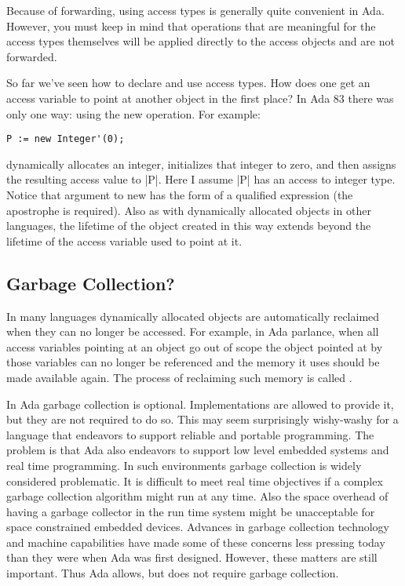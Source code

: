 Because of forwarding, using access types is generally quite convenient in Ada. However, you
must keep in mind that operations that are meaningful for the access types themselves will be
applied directly to the access objects and are not forwarded.

So far we've seen how to declare and use access types. How does one get an access variable to
point at another object in the first place? In Ada 83 there was only one way: using the new
operation. For example:

\begin{lstlisting}
P := new Integer'(0);
\end{lstlisting}

dynamically allocates an integer, initializes that integer to zero, and then assigns the
resulting access value to |P|. Here I assume |P| has an access to integer type. Notice that
argument to new has the form of a qualified expression (the apostrophe is required). Also as
with dynamically allocated objects in other languages, the lifetime of the object created in
this way extends beyond the lifetime of the access variable used to point at it.

\subsection{Garbage Collection?}

In many languages dynamically allocated objects are automatically reclaimed when they can no
longer be accessed. For example, in Ada parlance, when all access variables pointing at an
object go out of scope the object pointed at by those variables can no longer be referenced and
the memory it uses should be made available again. The process of reclaiming such memory is
called .

In Ada garbage collection is optional. Implementations are allowed to provide it, but they are
not required to do so. This may seem surprisingly wishy-washy for a language that endeavors to
support reliable and portable programming. The problem is that Ada also endeavors to support low
level embedded systems and real time programming. In such environments garbage collection is
widely considered problematic. It is difficult to meet real time objectives if a complex garbage
collection algorithm might run at any time. Also the space overhead of having a garbage
collector in the run time system might be unacceptable for space constrained embedded devices.
Advances in garbage collection technology and machine capabilities have made some of these
concerns less pressing today than they were when Ada was first designed. However, these matters
are still important. Thus Ada allows, but does not require garbage collection.


